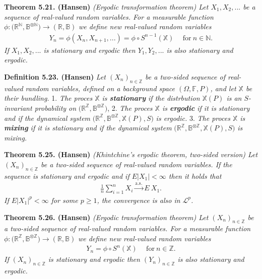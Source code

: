 \documentclass[a4paper,12pt,openany]{book}
\begin{document}
\textbf{Theorem 5.21. (Hansen)} \emph{(Ergodic transformation theorem) Let \(X_1,X_2,...\) be a sequence of real-valued random variables. For a measurable function} \(\phi : \big(\mathbb{R}^{\mathbb{N}},\mathbb{B}^{\otimes\mathbb{N}}\big)\to (\mathbb{R},\mathbb{B})\) \emph{we define new real-valued random variables}
\begin{align*}
    Y_n=\phi(X_n,X_{n+1},...)=\phi\circ S^{n-1}(\mathbb{X})\hspace{15pt}\text{for}\ n\in\mathbb{N}.
\end{align*}
\emph{If \(X_1,X_2,...\) is stationary and ergodic then \(Y_1,Y_2,...\) is also stationary and ergodic.}

\textbf{Definition 5.23. (Hansen)} \emph{Let \((X_n)_{n\in\mathbb{Z}}\) be a two-sided sequence of real-valued random variables, defined on a background space \((\Omega,\mathbb{F},P)\), and let \(\mathbb{X}\) be their bundling.}
1. \emph{The proces \(\mathbb{X}\) is \textbf{stationary} if the distrbution \(\mathbb{X}(P)\) is an \(S\)-invariant probability on} \(\Big(\mathbb{R}^{\mathbb{Z}},\mathbb{B}^{\otimes \mathbb{Z}}\Big)\),
2. \emph{The proces \(\mathbb{X}\) is \textbf{ergodic} if it is stationary and if the dynamical system} \(\Big(\mathbb{R}^{\mathbb{Z}},\mathbb{B}^{\otimes \mathbb{Z}},\mathbb{X}(P),S\Big)\) \emph{is ergodic.}
3. \emph{The proces \(\mathbb{X}\) is \textbf{mixing} if it is stationary and if the dynamical system} \(\Big(\mathbb{R}^{\mathbb{Z}},\mathbb{B}^{\otimes \mathbb{Z}},\mathbb{X}(P),S\Big)\) \emph{is mixing.}

\textbf{Theorem 5.25. (Hansen)} \emph{(Khintchine's ergodic theorem, two-sided version) Let \((X_n)_{n\in\mathbb{Z}}\) be a two-sided sequence of real-valued random variables. If the sequence is stationary and ergodic and if \(E\vert X_1\vert <\infty\) then it holds that}
\begin{align*}
    \frac{1}{n}\sum_{i=1}^nX_i\stackrel{\text{a.s.}}{\to} E\ X_1.\tag{5.30}
\end{align*}
\emph{If \(E\vert X_1\vert^p<\infty\) for some \(p\ge 1\), the convergence is also in \(\mathcal{L}^p\).}

\textbf{Theorem 5.26. (Hansen)} \emph{(Ergodic transformation theorem) Let \((X_n)_{n\in\mathbb{Z}}\) be a two-sided sequence of real-valued random variables. For a measurable function} \(\phi : \big(\mathbb{R}^{\mathbb{Z}},\mathbb{B}^{\otimes\mathbb{Z}}\big)\to (\mathbb{R},\mathbb{B})\) \emph{we define new real-valued random variables}
\begin{align*}
    Y_n=\phi\circ S^{n}(\mathbb{X})\hspace{15pt}\text{for}\ n\in\mathbb{Z}.
\end{align*}
\emph{If \((X_n)_{n\in\mathbb{Z}}\) is stationary and ergodic then \((Y_n)_{n\in\mathbb{Z}}\) is also stationary and ergodic.}
\end{document}
